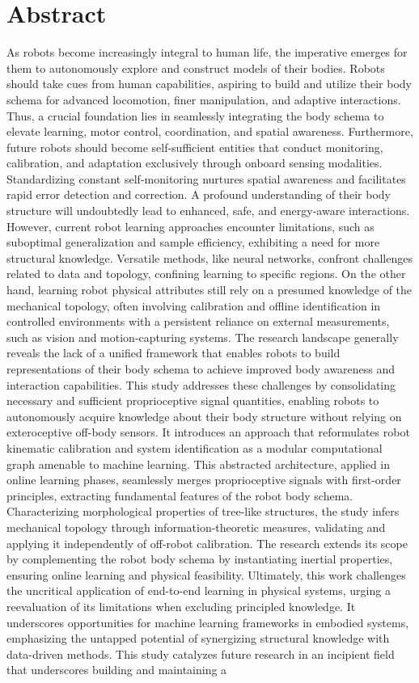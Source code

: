 \chapter*{Abstract}
As robots become increasingly integral to human life, the imperative emerges for them to autonomously explore and construct models of their bodies. Robots should take cues from human capabilities, aspiring to build and utilize their body schema for advanced locomotion, finer manipulation, and adaptive interactions. Thus, a crucial foundation lies in seamlessly integrating the body schema to elevate learning, motor control, coordination, and spatial awareness. Furthermore, future robots should become self-sufficient entities that conduct monitoring, calibration, and adaptation exclusively through onboard sensing modalities. Standardizing constant self-monitoring nurtures spatial awareness and facilitates rapid error detection and correction. A profound understanding of their body structure will undoubtedly lead to enhanced, safe, and energy-aware interactions. However, current robot learning approaches encounter limitations,  such as suboptimal generalization and sample efficiency, exhibiting a need for more structural knowledge. Versatile methods, like neural networks, confront challenges related to data and topology, confining learning to specific regions. On the other hand, learning robot physical attributes still rely on a presumed knowledge of the mechanical topology, often involving calibration and offline identification in controlled environments with a persistent reliance on external measurements, such as vision and motion-capturing systems. The research landscape generally reveals the lack of a unified framework that enables robots to build representations of their body schema to achieve improved body awareness and interaction capabilities. This study addresses these challenges by consolidating necessary and sufficient proprioceptive signal quantities, enabling robots to autonomously acquire knowledge about their body structure without relying on exteroceptive off-body sensors. It introduces an approach that reformulates robot kinematic calibration and system identification as a modular computational graph amenable to machine learning. This abstracted architecture, applied in online learning phases, seamlessly merges proprioceptive signals with first-order principles, extracting fundamental features of the robot body schema. Characterizing morphological properties of tree-like structures, the study infers mechanical topology through information-theoretic measures, validating and applying it independently of off-robot calibration. The research extends its scope by complementing the robot body schema by instantiating inertial properties, ensuring online learning and physical feasibility. Ultimately, this work challenges the uncritical application of end-to-end learning in physical systems, urging a reevaluation of its limitations when excluding principled knowledge. It underscores opportunities for machine learning frameworks in embodied systems, emphasizing the untapped potential of synergizing structural knowledge with data-driven methods. This study catalyzes future research in an incipient field that underscores building and maintaining a 